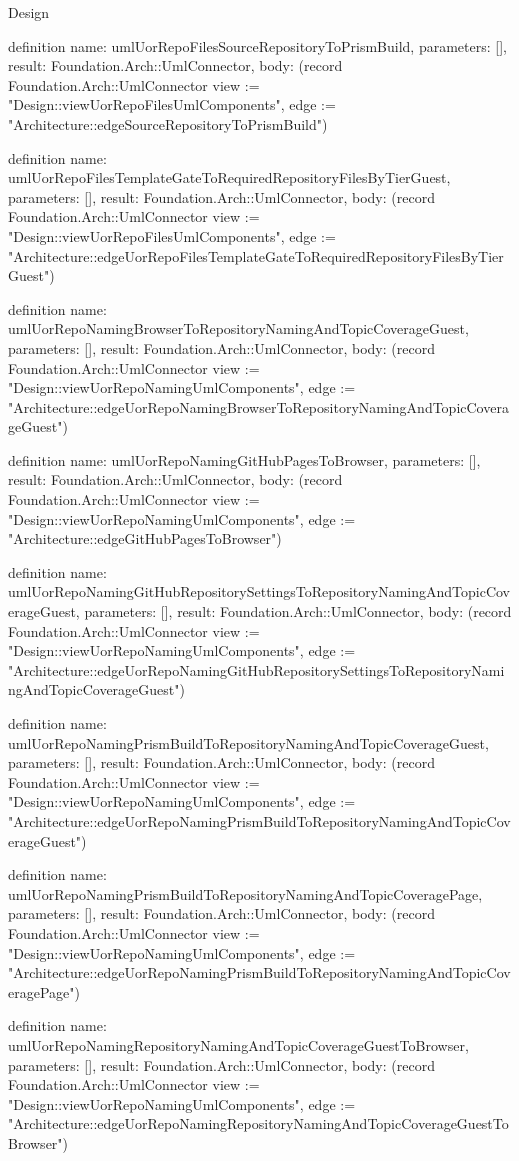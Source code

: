 \begin{lexlean}{Design}
\begin{semanticmodule}
definition{
  name: umlUorRepoFilesSourceRepositoryToPrismBuild,
  parameters: [],
  result: Foundation.Arch::UmlConnector,
  body: (record Foundation.Arch::UmlConnector {view := "Design::viewUorRepoFilesUmlComponents", edge := "Architecture::edgeSourceRepositoryToPrismBuild"})
}

definition{
  name: umlUorRepoFilesTemplateGateToRequiredRepositoryFilesByTierGuest,
  parameters: [],
  result: Foundation.Arch::UmlConnector,
  body: (record Foundation.Arch::UmlConnector {view := "Design::viewUorRepoFilesUmlComponents", edge := "Architecture::edgeUorRepoFilesTemplateGateToRequiredRepositoryFilesByTierGuest"})
}

definition{
  name: umlUorRepoNamingBrowserToRepositoryNamingAndTopicCoverageGuest,
  parameters: [],
  result: Foundation.Arch::UmlConnector,
  body: (record Foundation.Arch::UmlConnector {view := "Design::viewUorRepoNamingUmlComponents", edge := "Architecture::edgeUorRepoNamingBrowserToRepositoryNamingAndTopicCoverageGuest"})
}

definition{
  name: umlUorRepoNamingGitHubPagesToBrowser,
  parameters: [],
  result: Foundation.Arch::UmlConnector,
  body: (record Foundation.Arch::UmlConnector {view := "Design::viewUorRepoNamingUmlComponents", edge := "Architecture::edgeGitHubPagesToBrowser"})
}

definition{
  name: umlUorRepoNamingGitHubRepositorySettingsToRepositoryNamingAndTopicCoverageGuest,
  parameters: [],
  result: Foundation.Arch::UmlConnector,
  body: (record Foundation.Arch::UmlConnector {view := "Design::viewUorRepoNamingUmlComponents", edge := "Architecture::edgeUorRepoNamingGitHubRepositorySettingsToRepositoryNamingAndTopicCoverageGuest"})
}

definition{
  name: umlUorRepoNamingPrismBuildToRepositoryNamingAndTopicCoverageGuest,
  parameters: [],
  result: Foundation.Arch::UmlConnector,
  body: (record Foundation.Arch::UmlConnector {view := "Design::viewUorRepoNamingUmlComponents", edge := "Architecture::edgeUorRepoNamingPrismBuildToRepositoryNamingAndTopicCoverageGuest"})
}

definition{
  name: umlUorRepoNamingPrismBuildToRepositoryNamingAndTopicCoveragePage,
  parameters: [],
  result: Foundation.Arch::UmlConnector,
  body: (record Foundation.Arch::UmlConnector {view := "Design::viewUorRepoNamingUmlComponents", edge := "Architecture::edgeUorRepoNamingPrismBuildToRepositoryNamingAndTopicCoveragePage"})
}

definition{
  name: umlUorRepoNamingRepositoryNamingAndTopicCoverageGuestToBrowser,
  parameters: [],
  result: Foundation.Arch::UmlConnector,
  body: (record Foundation.Arch::UmlConnector {view := "Design::viewUorRepoNamingUmlComponents", edge := "Architecture::edgeUorRepoNamingRepositoryNamingAndTopicCoverageGuestToBrowser"})
}


\end{semanticmodule}
\end{lexlean}
